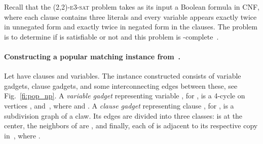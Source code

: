 \documentclass[11pt]{llncs}
\begin{document}
Recall that the \textsc{(2,2)-e3-sat} problem takes as its input a Boolean formula  in CNF, where each clause contains 
three literals and every variable appears exactly twice in unnegated form and exactly twice in negated form in the clauses. The problem 
is to determine if  is satisfiable or not and this problem is -complete~\cite{BKS03}.

\paragraph{Constructing a popular matching instance  from~.}
Let  have  clauses and  variables. The instance  constructed consists of  variable gadgets,  clause gadgets, and some interconnecting edges between these, see Fig.~\ref{fi:pop_np}. A \emph{variable gadget} representing variable , for , is a 4-cycle on vertices 
, and~, where  and . 
A \emph{clause gadget} representing clause , for , is a subdivision graph of a claw. Its 
edges are divided into three classes:  is at the center, the neighbors of  are , and 
finally, each of  is adjacent to its respective copy in~, where 
.
\end{document}
